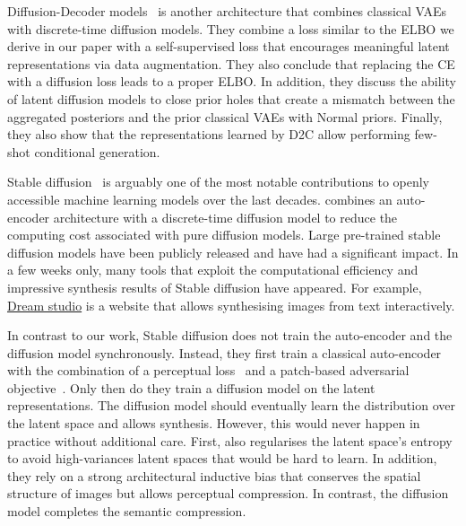Diffusion-Decoder models~\citep[][D2C]{sinha2021d2c} is another architecture that combines classical VAEs with discrete-time diffusion models. They combine a loss similar to the ELBO we derive in our paper with a self-supervised loss that encourages meaningful latent representations via data augmentation. They also conclude that replacing the CE with a diffusion loss leads to a proper ELBO. In addition, they discuss the ability of latent diffusion models to close prior holes that create a mismatch between the aggregated posteriors and the prior classical VAEs with Normal priors. Finally, they also show that the representations learned by D2C allow performing few-shot conditional generation.

Stable diffusion~\citep{rombach2022high} is arguably one of the most notable contributions to openly accessible machine learning models over the last decades. \citet{rombach2022high} combines an auto-encoder architecture with a discrete-time diffusion model to reduce the computing cost associated with pure diffusion models. Large pre-trained stable diffusion models have been publicly released and have had a significant impact. In a few weeks only, many tools that exploit the computational efficiency and impressive synthesis results of Stable diffusion have appeared. For example, \href{https://beta.dreamstudio.ai/}{Dream studio} is a website that allows synthesising images from text interactively.

In contrast to our work, Stable diffusion does not train the auto-encoder and the diffusion model synchronously. Instead, they first train a classical auto-encoder with the combination of a perceptual loss~\citep{zhang2018unreasonable} and a patch-based adversarial objective~\citep{dosovitskiy2016generating, esser2021taming, yu2021vector}. Only then do they train a diffusion model on the latent representations. The diffusion model should eventually learn the distribution over the latent space and allows synthesis. However, this would never happen in practice without additional care. First, \citet{rombach2022high} also regularises the latent space's entropy to avoid high-variances latent spaces that would be hard to learn. In addition, they rely on a strong architectural inductive bias that conserves the spatial structure of images but allows perceptual compression. In contrast, the diffusion model completes the semantic compression.

